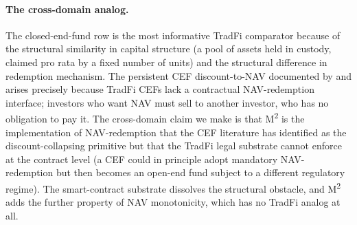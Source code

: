 \paragraph{The cross-domain analog.} The closed-end-fund row is the most informative TradFi comparator because of the structural similarity in capital structure (a pool of assets held in custody, claimed pro rata by a fixed number of units) and the structural difference in redemption mechanism. The persistent CEF discount-to-NAV documented by \citet{LeeShleiferThaler1991} and \citet{Pontiff1996} arises precisely because TradFi CEFs lack a contractual NAV-redemption interface; investors who want NAV must sell to another investor, who has no obligation to pay it. The cross-domain claim we make is that M\textsuperscript{2} is the implementation of NAV-redemption that the CEF literature has identified as the discount-collapsing primitive but that the TradFi legal substrate cannot enforce at the contract level (a CEF could in principle adopt mandatory NAV-redemption but then becomes an open-end fund subject to a different regulatory regime). The smart-contract substrate dissolves the structural obstacle, and M\textsuperscript{2} adds the further property of NAV monotonicity, which has no TradFi analog at all.
